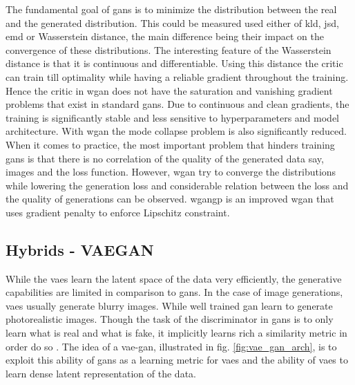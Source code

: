 

The fundamental goal of \acp{gan} is to minimize the distribution between the real and the generated distribution. This could be measured used either of \ac{kld}, \ac{jsd}, \ac{emd} or Wasserstein distance, the main difference being their impact on the convergence of these distributions. The interesting feature of the Wasserstein distance is that it is continuous and differentiable. Using this distance the critic can train till optimality while having a reliable gradient throughout the training. Hence the critic in \ac{wgan} does not have the saturation and vanishing gradient problems that exist in standard \acp{gan}. Due to continuous and clean gradients, the training is significantly stable and less sensitive to hyperparameters and model architecture. With \ac{wgan} the mode collapse problem is also significantly reduced. When it comes to practice, the most important problem that hinders training \acp{gan} is that there is no correlation of the quality of the generated data say, images and the loss function. However, \ac{wgan} try to converge the distributions while lowering the generation loss and considerable relation between the loss and the quality of generations can be observed. \ac{wgangp} \cite{wgangp} is an improved \ac{wgan} that uses gradient penalty to enforce Lipschitz constraint.


\subsection{Hybrids - VAEGAN}
While the \acp{vae} learn the latent space of the data very efficiently, the generative capabilities are limited in comparison to \acp{gan}. In the case of image generations, \acp{vae} usually generate blurry images. While well trained \ac{gan} learn to generate photorealistic images. Though the task of the discriminator in \acp{gan} is to only learn what is real and what is fake, it implicitly learns rich a similarity metric in order do so \cite{autoencoding_beyond_pixels}. The idea of a \ac{vae}-\ac{gan}, illustrated in fig. \ref{fig:vae_gan_arch}, is to exploit this ability of \acp{gan} as a learning metric for \acp{vae} and the ability of \acp{vae} to learn dense latent representation of the data.

